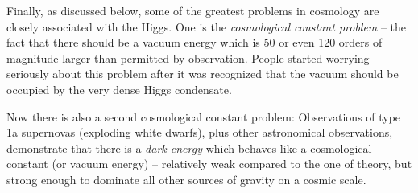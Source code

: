 \documentclass[12pt]{iopart}
\begin{document}
Finally, as discussed below, some of the greatest problems in cosmology are closely associated with the Higgs.  One is the \textit{cosmological constant problem} -- the fact that there should be a vacuum energy which is 50 or even 120 orders of magnitude larger than permitted by observation. People started worrying seriously about this problem after it was recognized that the vacuum should be occupied by the very dense Higgs condensate. 

Now there is also a second cosmological constant problem: Observations of type 1a supernovas (exploding white dwarfs), plus other astronomical observations, demonstrate that there is a \textit{dark energy} which behaves like a cosmological constant (or vacuum energy) -- relatively weak compared to the one of theory, but strong enough to dominate all other sources of gravity on a cosmic scale. 
\end{document}
